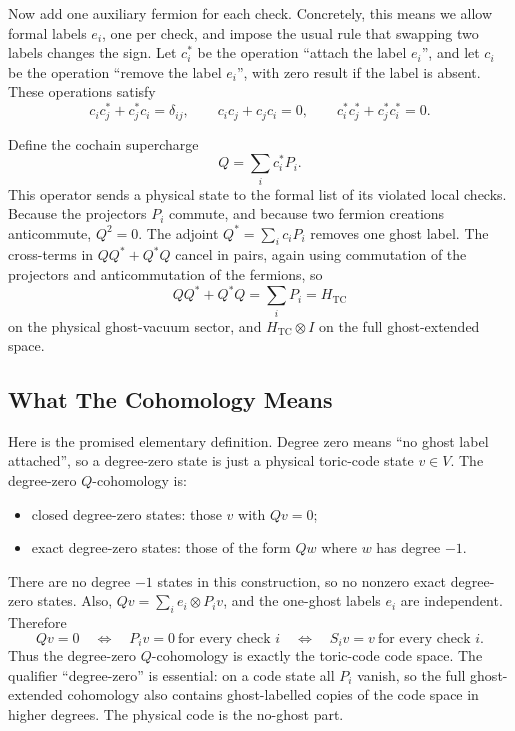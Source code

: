Now add one auxiliary fermion for each check. Concretely, this means we allow
formal labels \(e_i\), one per check, and impose the usual rule that swapping
two labels changes the sign. Let \(c_i^*\) be the operation ``attach the label
\(e_i\)'', and let \(c_i\) be the operation ``remove the label \(e_i\)'',
with zero result if the label is absent. These operations satisfy
\[
  c_i c_j^* + c_j^* c_i = \delta_{ij}, \qquad
  c_i c_j + c_j c_i = 0, \qquad
  c_i^* c_j^* + c_j^* c_i^* = 0 .
\]

Define the cochain supercharge
\[
  Q = \sum_i c_i^* P_i .
\]
This operator sends a physical state to the formal list of its violated local
checks. Because the projectors \(P_i\) commute, and because two fermion
creations anticommute, \(Q^2=0\). The adjoint \(Q^*=\sum_i c_i P_i\) removes
one ghost label. The cross-terms in \(Q Q^*+Q^* Q\) cancel in pairs, again
using commutation of the projectors and anticommutation of the fermions, so
\[
  Q Q^* + Q^* Q = \sum_i P_i = H_{\mathrm{TC}}
\]
on the physical ghost-vacuum sector, and \(H_{\mathrm{TC}}\otimes I\) on the
full ghost-extended space.

\subsection{What The Cohomology Means}

Here is the promised elementary definition. Degree zero means ``no ghost label
attached'', so a degree-zero state is just a physical toric-code state
\(v\in V\). The degree-zero \(Q\)-cohomology is:

\begin{itemize}
  \item closed degree-zero states: those \(v\) with \(Qv=0\);
  \item exact degree-zero states: those of the form \(Qw\) where \(w\) has
  degree \(-1\).
\end{itemize}

There are no degree \(-1\) states in this construction, so no nonzero exact
degree-zero states. Also, \(Qv=\sum_i e_i\otimes P_i v\), and the one-ghost
labels \(e_i\) are independent. Therefore
\[
  Qv=0
  \quad\Longleftrightarrow\quad
  P_i v=0\ \text{for every check }i
  \quad\Longleftrightarrow\quad
  S_i v=v\ \text{for every check }i .
\]
Thus the degree-zero \(Q\)-cohomology is exactly the toric-code code space.
The qualifier ``degree-zero'' is essential: on a code state all \(P_i\) vanish,
so the full ghost-extended cohomology also contains ghost-labelled copies of
the code space in higher degrees. The physical code is the no-ghost part.

